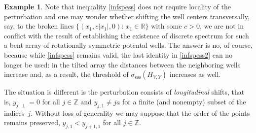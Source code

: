 \documentclass{article}
\numberwithin{equation}{section}
\theoremstyle{definition}
\newtheorem{example}[theorem]{Example}
\newcommand{\R}{\mathbb{R}}
\newcommand{\Z}{\mathbb{Z}}
\begin{document}
\begin{example}
Note that inequality \eqref{infspess} does not require locality of the perturbation and one may wonder whether shifting the well centers transversally, say, to the broken lines $\{(x_1,c|x_1|,0):\, x_1\in\R\}$ with some $c>0$, we are not in conflict with the result of \cite{Ex24} establishing the existence of discrete spectrum for such a bent array of rotationally symmetric potental wells. The answer is no, of course, because while \eqref{infspess} remains valid, the last identity in \eqref{infspess2} can no longer be used: in the tilted array the distances between the neighboring wells increase and, as a result, the threshold of $\sigma_\mathrm{ess}(H_{V,Y})$ increases as well.
\end{example}

The situation is different is the perturbation consists of \emph{longitudinal} shifts, that is, $y_{j,\perp}=0$ for all $j\in\Z$ and $y_{j,1}\ne ja$ for a finite (and nonempty) subset of the indices~$j$. Without loss of generality we may suppose that the order of the points remains preserved, $y_{j,1}<y_{j+1,1}$ for all $j\in\Z$.
\end{document}
